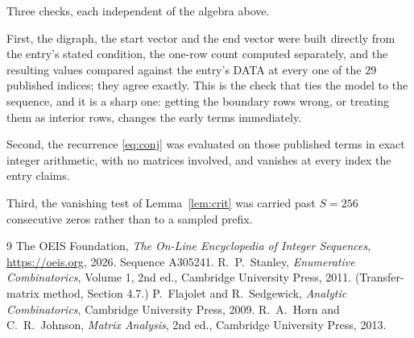 \documentclass[11pt,a4paper]{article}
\theoremstyle{plain}
\theoremstyle{definition}
\begin{document}
Three checks, each independent of the algebra above.

First, the digraph, the start vector and the end vector were built directly from the
entry's stated condition, the one-row count computed separately, and the resulting values
compared against the entry's DATA at every one of the $29$ published indices; they
agree exactly. This is the check that ties the model to the sequence, and it is a sharp one:
getting the boundary rows wrong, or treating them as interior rows, changes the early terms
immediately.

Second, the recurrence \eqref{eq:conj} was evaluated on those published terms in exact
integer arithmetic, with no matrices involved, and vanishes at every index the entry claims.

Third, the vanishing test of Lemma~\ref{lem:crit} was carried past $S=256$ consecutive
zeros rather than to a sampled prefix.

\begin{thebibliography}{9}
 The OEIS Foundation, \emph{The On-Line Encyclopedia of Integer
Sequences}, \url{https://oeis.org}, 2026. Sequence A305241.
 R.~P.~Stanley, \emph{Enumerative Combinatorics}, Volume 1, 2nd ed.,
Cambridge University Press, 2011. (Transfer-matrix method, Section 4.7.)
 P.~Flajolet and R.~Sedgewick, \emph{Analytic Combinatorics}, Cambridge
University Press, 2009.
 R.~A.~Horn and C.~R.~Johnson, \emph{Matrix Analysis}, 2nd ed., Cambridge
University Press, 2013.
\end{thebibliography}
\end{document}
